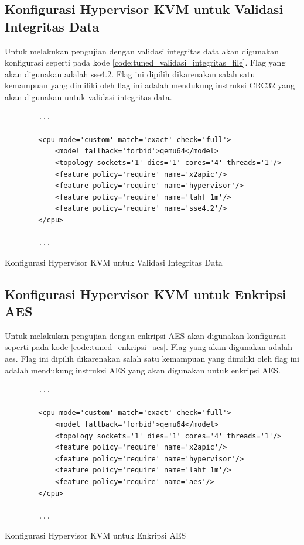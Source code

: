 \subsection{Konfigurasi Hypervisor KVM untuk Validasi Integritas Data}
Untuk melakukan pengujian dengan validasi integritas data akan digunakan konfigurasi seperti pada kode \ref{code:tuned_validasi_integritas_file}. Flag yang akan digunakan adalah sse4.2. Flag ini dipilih dikarenakan salah satu kemampuan yang dimiliki oleh flag ini adalah mendukung instruksi CRC32 yang akan digunakan untuk validasi integritas data.

\begin{listing}[H]
    \begin{verbatim}
        ...

        <cpu mode='custom' match='exact' check='full'>
            <model fallback='forbid'>qemu64</model>
            <topology sockets='1' dies='1' cores='4' threads='1'/>
            <feature policy='require' name='x2apic'/>
            <feature policy='require' name='hypervisor'/> 
            <feature policy='require' name='lahf_1m'/>
            <feature policy='require' name='sse4.2'/>
        </cpu>
        
        ...
    \end{verbatim}
    \caption{Konfigurasi Hypervisor KVM untuk Validasi Integritas Data}
    \label{code:tuned_validasi_integritas_file}
\end{listing}

\subsection{Konfigurasi Hypervisor KVM untuk Enkripsi AES}
Untuk melakukan pengujian dengan enkripsi AES akan digunakan konfigurasi seperti pada kode \ref{code:tuned_enkripsi_aes}. Flag yang akan digunakan adalah aes. Flag ini dipilih dikarenakan salah satu kemampuan yang dimiliki oleh flag ini adalah mendukung instruksi AES yang akan digunakan untuk enkripsi AES.

\begin{listing}[H]
    \begin{verbatim}
        ...

        <cpu mode='custom' match='exact' check='full'>
            <model fallback='forbid'>qemu64</model>
            <topology sockets='1' dies='1' cores='4' threads='1'/>
            <feature policy='require' name='x2apic'/>
            <feature policy='require' name='hypervisor'/> 
            <feature policy='require' name='lahf_1m'/>
            <feature policy='require' name='aes'/>
        </cpu>
        
        ...
    \end{verbatim}
    \caption{Konfigurasi Hypervisor KVM untuk Enkripsi AES}
    \label{code:tuned_enkripsi_aes}
\end{listing}

